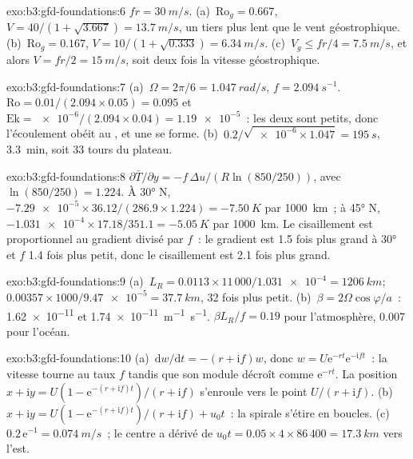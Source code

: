 \begin{solution}{exo:b3:gfd-foundations:6}
$fr = \qty{30}{m/s}$. (a)~$\mathrm{Ro}_g = 0.667$, $V = 40/(1 + \sqrt{3.667})
= \qty{13.7}{m/s}$, un tiers plus lent que le vent géostrophique. (b)~$\mathrm{Ro}_g =
0.167$, $V = 10/(1 + \sqrt{0.333}) = \qty{6.34}{m/s}$. (c)~$V_g \le fr/4 =
\qty{7.5}{m/s}$, et alors $V = fr/2 = \qty{15}{m/s}$, soit deux fois
la vitesse géostrophique.
\end{solution}

\begin{solution}{exo:b3:gfd-foundations:7}
(a)~$\Omega = 2\pi/6 = \qty{1.047}{rad/s}$, $f = \qty{2.094}{s^{-1}}$.
$\mathrm{Ro} = 0.01/(2.094\times0.05) = 0.095$ et $\mathrm{Ek} =
\num{e-6}/(2.094\times0.04) = \num{1.19e-5}$~: les deux sont petits, donc l'écoulement obéit
au , et une  se forme. (b)~$0.2/\sqrt{\num{e-6}
\times1.047} = \qty{195}{s}$, \qty{3.3}{min}, soit 33 tours du plateau.
\end{solution}

\begin{solution}{exo:b3:gfd-foundations:8}
$\partial\bar T/\partial y = -f\,\Delta u/(R\ln(850/250))$, avec
$\ln(850/250) = 1.224$. À \ang{30} N, $-\num{7.29e-5}\times36.12/(286.9
\times1.224) = \qty{-7.50}{K}$ par \qty{1000}{km}~; à \ang{45} N,
$-\num{1.031e-4}\times17.18/351.1 = \qty{-5.05}{K}$ par \qty{1000}{km}. Le
cisaillement est proportionnel au gradient divisé par $f$~: le gradient est 1.5
fois plus grand à \ang{30} et $f$ 1.4 fois plus petit, donc le cisaillement est 2.1 fois
plus grand.
\end{solution}

\begin{solution}{exo:b3:gfd-foundations:9}
(a)~$L_R = 0.0113\times11\,000/\num{1.031e-4} = \qty{1206}{km}$;
$0.00357\times1000/\num{9.47e-5} = \qty{37.7}{km}$, 32 fois plus petit.
(b)~$\beta = 2\Omega\cos\varphi/a$~: \num{1.62e-11} et
\qty{1.74e-11}{m^{-1}.s^{-1}}. $\beta L_R/f = 0.19$ pour l'atmosphère, 0.007
pour l'océan.
\end{solution}

\begin{solution}{exo:b3:gfd-foundations:10}
(a)~$\mathrm dw/\mathrm dt = -(r + \mathrm if)w$, donc $w = U\mathrm
e^{-rt}\mathrm e^{-\mathrm ift}$~: la vitesse tourne au taux $f$ tandis que
son module décroît comme $\mathrm e^{-rt}$. La position $x + \mathrm iy =
U(1 - \mathrm e^{-(r + \mathrm if)t})/(r + \mathrm if)$ s'enroule vers le
point $U/(r + \mathrm if)$. (b)~$x + \mathrm iy = U(1 - \mathrm e^{-(r +
\mathrm if)t})/(r + \mathrm if) + u_0t$~: la spirale s'étire en boucles.
(c)~$0.2\,\mathrm e^{-1} = \qty{0.074}{m/s}$~; le centre a dérivé de $u_0t =
0.05\times4\times86\,400 = \qty{17.3}{km}$ vers l'est.
\end{solution}

